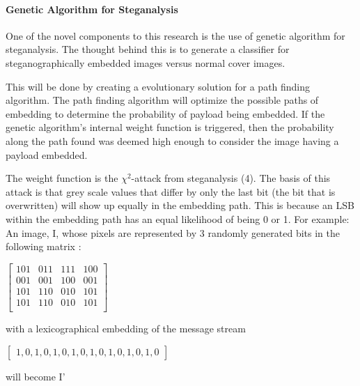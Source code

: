 \documentclass[12pt]{article}
\begin{document}
\paragraph{Genetic Algorithm for Steganalysis}
\par One of the novel components to this research is the use of genetic algorithm for steganalysis. The thought behind this is to generate a classifier for steganographically embedded images versus normal cover images.
\par This will be done by creating a evolutionary solution for a path finding algorithm. The path finding algorithm will optimize the possible paths of embedding to determine the probability of payload being embedded. If the genetic algorithm's internal weight function is triggered, then the probability along the path found was deemed high enough to consider the image having a payload embedded.
\par The weight function is the $\chi ^ 2$-attack from steganalysis (4). The basis of this attack is that grey scale values that differ by only the last bit (the bit that is overwritten) will show up equally in the embedding path. This is because an LSB within the embedding path has an equal likelihood of being 0 or 1.
For example: \\
An image, I, whose pixels are represented by 3 randomly generated bits in the following matrix : 
\begin{center}
$  \left[ \begin{array}{cccc} 
 101 & 011 & 111 & 100\\
  001 & 001 & 100 & 001\\
 101 & 110 & 010 & 101 \\
 101 & 110 & 010 & 101 \\  \end{array} \right] $ 
\end{center}
with a lexicographical embedding of the message stream 
\begin{center}
$ \left[ \begin{array}{c} 1,  0 , 1,  0,  1,  0,  1,  0,  1,  0,  1,  0,  1,  0,  1,  0 \end{array} \right] $
\end{center}
will become I'
\end{document}
